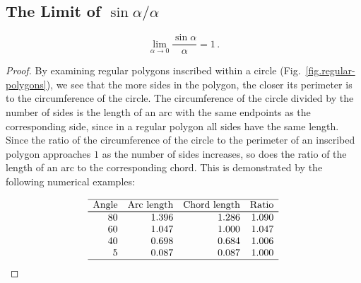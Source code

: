 \vspace*{-9ex}

\subsection{The Limit of $\sin\alpha/\alpha$}\label{s.sin-over-x}

\begin{theorem}\label{thm.limit-sine-over}
\[
\lim_{\alpha\rightarrow 0}\frac{\sin\alpha}{\alpha}=1\,.
\]
\end{theorem}

\begin{proof}
By examining  regular polygons inscribed within a circle (Fig.~\ref{fig.regular-polygons}), we see that the more sides in the polygon, the closer its perimeter is to the circumference of the circle. The circumference of the circle divided by the number of sides is the length of an arc with the same endpoints as the corresponding side, since in a regular polygon all sides have the same length. Since the ratio of the circumference of the circle to the perimeter of an inscribed polygon approaches $1$ as the number of sides increases, so does the ratio of the length of an arc to the corresponding chord. This is demonstrated by the following numerical examples:

\enlargethispage{\baselineskip}
\vspace{-1ex}

\[
\begin{array}{r@{\hspace{10pt}}r@{\hspace{10pt}}r@{\hspace{10pt}}r}
\hline
\textrm{Angle} & \textrm{Arc length} & \textrm{Chord length} & \textrm{Ratio}\\\svhline
80 & 1.396 & 1.286  & 1.090\\
60 & 1.047 & 1.000  & 1.047\\
40 & 0.698 & 0.684 & 1.006\\
5  & 0.087 & 0.087 &1.000 \\\hline
\end{array}
\]


\end{proof}
